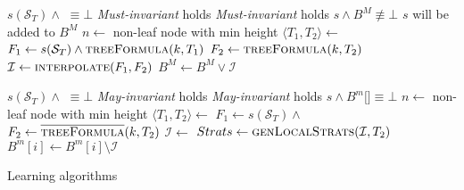 \begin{algorithm}
    \begin{algorithmic}[1]
        \Require $s(\mathcal{S}_T) \land $  $\equiv \bot$
        \Require \emph{Must-invariant} holds
        \Ensure \emph{Must-invariant} holds
        \Ensure $s \land B^M \not\equiv \bot$
        \Comment $s$ will be added to $B^M$
                \Return
            \EndIIf
            \State $n \gets $ non-leaf node with min height 
            \State $\langle T_1, T_2 \rangle \gets $ 
            \State $F_1 \gets s(\mathcal{S}_T) \land \Call{treeFormula}{k, T_1}$
            \State $F_2 \gets \Call{treeFormula}{k, T_2}$
            \State $\mathcal{I} \gets  \Call{interpolate}{F_1, F_2}$
            \State $B^M \gets B^M \lor \mathcal{I}$
            \State {}
        \EndFunction
    \end{algorithmic}
    
    \begin{algorithmic}[1]
        \Require $s(\mathcal{S}_T) \land $  $\equiv \bot$
        \Require \emph{May-invariant} holds
        \Ensure \emph{May-invariant} holds
        \Ensure $s \land B^m[$$] \equiv \bot$
                \Return
            \EndIIf
            \State $n \gets $ non-leaf node with min height 
            \State $\langle T_1, T_2 \rangle \gets $ 
            \State $F_1 \gets s(\mathcal{S}_T) \land $ 
            \State $F_2 \gets \Call{\textoverline{treeFormula}}{k, T_2}$
            \State $\mathcal{I} \gets $ 
                \State $Strats \gets \Call{genLocalStrats}{\mathcal{I}, T_2}$\label{line:cstrats}
            \EndIf
                \State $B^m[i] \gets B^m[i] \setminus \mathcal{I}$
            \EndFor
            \State {}
        \EndFunction
    \end{algorithmic}
    \caption{Learning algorithms}
    \label{alg:learn}
\end{algorithm}


